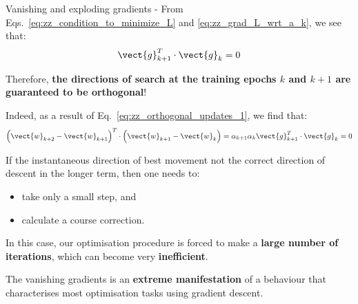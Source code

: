 \begin{frame}[t,allowframebreaks]{
    Vanishing and exploding gradients -}
    From Eqs.~\ref{eq:zz_condition_to_minimize_L}
    and \ref{eq:zz_grad_L_wrt_a_k}, we see that:
    \begin{equation}
        \vect{g}_{k+1}^T \cdot \vect{g}_{k} = 0
        \label{eq:zz_orthogonal_updates_1}    
    \end{equation}
    
    Therefore, {\bf the directions of search at the training 
    \glspl{epoch} 
    $k$ and $k+1$ are guaranteed to be orthogonal}!\\
    \vspace{0.2cm}
    
    Indeed, as a result of Eq.~\ref{eq:zz_orthogonal_updates_1},
    we find that:
    \begin{equation}
      \Big(\vect{w}_{k+2}-\vect{w}_{k+1}\Big)^T \cdot
      \Big(\vect{w}_{k+1}-\vect{w}_{k}\Big) = 
      \alpha_{k+1} \alpha_{k} \vect{g}_{k+1}^T \cdot \vect{g}_{k} = 0
      \label{eq:zz_orthogonal_updates_2}    
    \end{equation}
        
    \framebreak


    If the instantaneous direction of best movement 
    not the correct direction of 
    descent in the longer term, then one needs to:
    \begin{itemize}
        \item take only a small step, and
        \item calculate a course correction.
    \end{itemize}    

    \vspace{0.1cm}

    In this case, our \gls{optimisation} procedure 
    is forced to make a {\bf large number of iterations},
    which can become very {\bf inefficient}.\\

    \vspace{0.2cm}

    The \glspl{vanishing gradient} 
    is an {\bf extreme manifestation}
    of a behaviour that characterises most
    \gls{optimisation} tasks using
    \gls{gradient descent}.\\

\end{frame}
